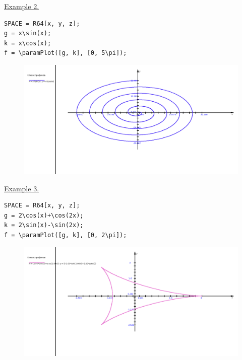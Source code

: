 \eject
\underline{Example 2. }


\vspace*{-2mm}
\begin{verbatim}
SPACE = R64[x, y, z];
g = x\sin(x);
k = x\cos(x);
f = \paramPlot([g, k], [0, 5\pi]);
\end{verbatim}
\vspace*{-2mm}

\begin{figure}[h!]
 \includegraphics[scale=0.3]{pictures/2_2}
\vspace*{-10mm}
\caption{}
\label{2_2}
\end{figure}



\underline{Example 3. }


\vspace*{-2mm}
\begin{verbatim}
SPACE = R64[x, y, z];
g = 2\cos(x)+\cos(2x); 
k = 2\sin(x)-\sin(2x);
f = \paramPlot([g, k], [0, 2\pi]);
\end{verbatim}
\vspace*{-2mm}

\begin{figure}[h!]
 \includegraphics[scale=0.3]{pictures/2_3}
\vspace*{-10mm}
\caption{}
\label{2_3}
\end{figure}

